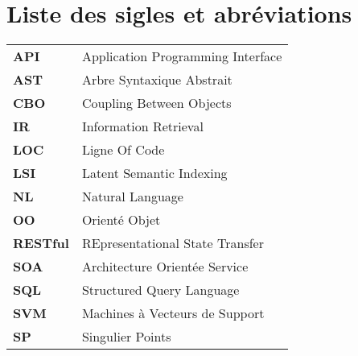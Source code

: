 \chapter*{Liste des sigles et abréviations}%
\begin{table}[H]
	\label{my-label}
	\begin{tabular}{ll}
		\textbf{API} & Application Programming Interface    \\
		\textbf{AST}   & Arbre Syntaxique Abstrait                          \\
		\textbf{CBO}  & Coupling Between Objects                \\
		\textbf{IR}  & Information Retrieval                 \\
		\textbf{LOC}  & Ligne Of Code                     \\
		\textbf{LSI}  & Latent Semantic Indexing                    \\
		\textbf{NL}  & Natural Language               \\
		\textbf{OO} & Orienté Objet \\
			\textbf{RESTful} & REpresentational State Transfer \\
			\textbf{SOA} & Architecture Orientée Service \\
			\textbf{SQL} & Structured Query Language \\
		\textbf{SVM} & Machines à Vecteurs de Support                \\
		
		\textbf{SP}   & Singulier Points                        
	\end{tabular}
\end{table}